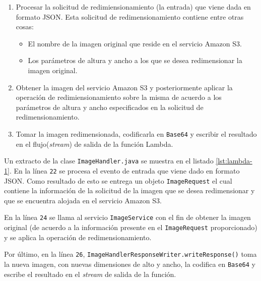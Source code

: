 \begin{enumerate}
    \item Procesar la solicitud de redimiensionamiento (la entrada) que viene dada en formato JSON. Esta solicitud de redimensionamiento contiene entre otras cosas:
    \begin{itemize}
        \item El nombre de la imagen original que reside en el servicio Amazon S3.
        \item Los parámetros de altura y ancho a los que se desea redimensionar la imagen original.
    \end{itemize}
    \item Obtener la imagen del servicio Amazon S3 y posteriormente aplicar la operación de redimiensionamiento sobre la misma de acuerdo a los parámetros de altura y ancho especificados en la solicitud de redimensionamiento.
    \item Tomar la imagen redimensionada, codificarla en \texttt{Base64} y escribir el resultado en el flujo(\emph{stream}) de salida de la función Lambda.
\end{enumerate}
 
Un extracto de la clase \texttt{ImageHandler.java} se muestra en el listado \ref{lst:lambda-1}. En la línea \texttt{22} se procesa el evento de entrada que viene dado en formato JSON. Como resultado de esto se entrega un objeto \texttt{ImageRequest} el cual contiene la información de la solicitud de la imagen que se desea redimensionar y que se encuentra alojada en el servicio Amazon S3.

En la línea \texttt{24} se llama al servicio \texttt{ImageService} con el fin de obtener la imagen   original (de acuerdo a la información presente en el \texttt{ImageRequest} proporcionado) y se aplica la operación de redimensionamiento.

Por último, en la línea \texttt{26}, \texttt{ImageHandlerResponseWriter.writeResponse()} toma la nueva imagen, con nuevas dimensiones de alto y ancho, la codifica en \texttt{Base64} y escribe el resultado en el \emph{stream} de salida de la función. 

